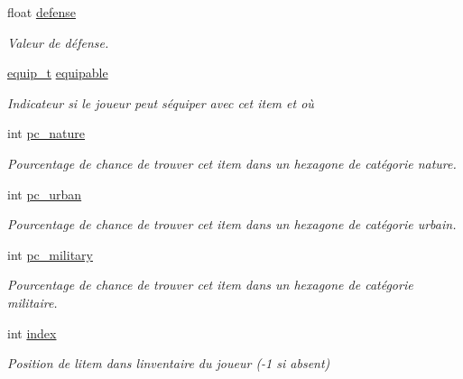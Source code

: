 \begin{DoxyCompactItemize}
\mbox{\label{structitem__t_a4858547e0356d38480e2948ca2d3bfca}} 
float \hyperlink{structitem__t_a4858547e0356d38480e2948ca2d3bfca}{defense}
\begin{DoxyCompactList}\small\item\em Valeur de défense. \end{DoxyCompactList}\item 
\mbox{\label{structitem__t_aa8f62d513493971382f20c75b40547a4}} 
\hyperlink{commun_8h_a3ea2f7654645c7af9da2451ca3a656eb}{equip\+\_\+t} \hyperlink{structitem__t_aa8f62d513493971382f20c75b40547a4}{equipable}
\begin{DoxyCompactList}\small\item\em Indicateur si le joueur peut s\textquotesingle{}équiper avec cet item et où \end{DoxyCompactList}\item 
\mbox{\label{structitem__t_a91e67c77c8addf311455d310f223992f}} 
int \hyperlink{structitem__t_a91e67c77c8addf311455d310f223992f}{pc\+\_\+nature}
\begin{DoxyCompactList}\small\item\em Pourcentage de chance de trouver cet item dans un hexagone de catégorie nature. \end{DoxyCompactList}\item 
\mbox{\label{structitem__t_a99453bb16678ccb6f2ab510b630b202a}} 
int \hyperlink{structitem__t_a99453bb16678ccb6f2ab510b630b202a}{pc\+\_\+urban}
\begin{DoxyCompactList}\small\item\em Pourcentage de chance de trouver cet item dans un hexagone de catégorie urbain. \end{DoxyCompactList}\item 
\mbox{\label{structitem__t_ae1a40200893e1ac7cafeba1d3b896348}} 
int \hyperlink{structitem__t_ae1a40200893e1ac7cafeba1d3b896348}{pc\+\_\+military}
\begin{DoxyCompactList}\small\item\em Pourcentage de chance de trouver cet item dans un hexagone de catégorie militaire. \end{DoxyCompactList}\item 
\mbox{\label{structitem__t_ad3016bc8fa5aff004bd76d27c65caf36}} 
int \hyperlink{structitem__t_ad3016bc8fa5aff004bd76d27c65caf36}{index}
\begin{DoxyCompactList}\small\item\em Position de l\textquotesingle{}item dans l\textquotesingle{}inventaire du joueur (-\/1 si absent) \end{DoxyCompactList}\end{DoxyCompactItemize}


